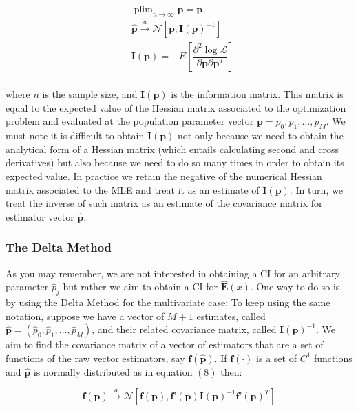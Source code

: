 \documentclass[12pt]{article}         %
\DeclareMathOperator*{\plim}{plim}
\begin{document}
\begin{equation}
\begin{split}
& \plim_{n\to \infty} \hat{\textbf{p}} = \textbf{p} \\
& \hat{\textbf{p}} \overset{a}{\to} \mathcal{N}\left[\textbf{p},\textbf{I}\left(\textbf{p}\right)^{-1}\right] \\
& \textbf{I}\left(\textbf{p}\right) = -E\left[\dfrac{\partial^2 \log\mathcal{L}}{\partial \textbf{p} \partial \textbf{p}^{T}} \right] \\
\end{split}
\end{equation}

where $n$ is the sample size, and $\textbf{I}\left(\textbf{p}\right)$ is the information matrix. This matrix is equal to the expected value of the Hessian matrix associated to the optimization problem and evaluated at the population parameter vector $\textbf{p} = p_0,p_1,...,p_M$. We must note it is difficult to obtain $\textbf{I}\left(\textbf{p}\right)$ not only because we need to obtain the analytical form of a Hessian matrix (which entails calculating second and cross derivatives) but also because we need to do so many times in order to obtain its expected value. In practice we retain the negative of the numerical Hessian matrix associated to the MLE and treat it as an estimate of $\textbf{I}\left(\textbf{p}\right)$. In turn, we treat the inverse of such matrix as an estimate of the covariance matrix for estimator vector $\hat{\textbf{p}}$.


\subsubsection{The Delta Method}
As you may remember, we are not interested in obtaining a CI for an arbitrary parameter $\hat{p}_j$ but rather we aim to obtain a CI for $\mathbf{\hat{E}}(x)$. One way to do so is by using the Delta Method for the multivariate case: To keep using the same notation, suppose we have a vector of $M+1$ estimates, called $\hat{\textbf{p}}=(\hat{p}_0,\hat{p}_1,...,\hat{p}_M)$, and their related covariance matrix, called $\textbf{I}\left(\textbf{p}\right)^{-1}$. We aim to find the covariance matrix of a vector of estimators that are a set of functions of the raw vector estimators, say $\textbf{f}(\hat{\textbf{p}})$. If $\textbf{f}(\cdot)$ is a set of $C^1$ functions and $\hat{\textbf{p}}$ is normally distributed as in equation $(8)$ then:

\begin{equation}
\textbf{f}(\hat{\textbf{p}}) \overset{a}{\to} \mathcal{N}\left[\textbf{f}(\textbf{p}),\textbf{f'}(\textbf{p})\textbf{I}\left(\textbf{p}\right)^{-1}\textbf{f'}(\textbf{p})^{T}\right]
\end{equation}
\end{document}
